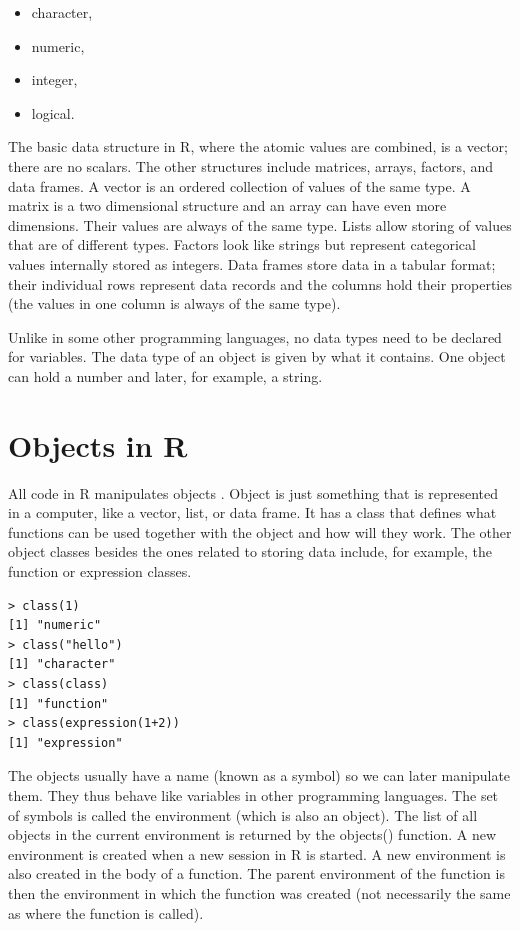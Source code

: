 \documentclass[11pt,openany,executivepaper]{book}
\begin{document}
\begin{itemize}
  \item character,
  \item numeric,
  \item integer,
  \item logical.
\end{itemize}

The basic data structure in R, where the atomic values are combined, is a vector; there are no scalars. The other structures include matrices, arrays, factors, and data frames. A vector is an ordered collection of values of the same type. A matrix is a two dimensional structure and an array can have even more dimensions. Their values are always of the same type. Lists allow storing of values that are of different types. Factors look like strings but represent categorical values internally stored as integers. Data frames store data in a tabular format; their individual rows represent data records and the columns hold their properties (the values in one column is always of the same type).

Unlike in some other programming languages, no data types need to be declared for variables. The data type of an object is given by what it contains. One object can hold a number and later, for example, a string.

\section{Objects in R}
All code in R manipulates objects \cite{4}. Object is just something that is represented in a computer, like a vector, list, or data frame. It has a class that defines what functions can be used together with the object and how will they work. The other object classes besides the ones related to storing data include, for example, the function or expression classes.

\begin{verbatim}
> class(1)
[1] "numeric"
> class("hello")
[1] "character"
> class(class)
[1] "function"
> class(expression(1+2))
[1] "expression"
\end{verbatim}

The objects usually have a name (known as a symbol) so we can later manipulate them. They thus behave like variables in other programming languages. The set of symbols is called the environment (which is also an object). The list of all objects in the current environment is returned by the objects() function. A new environment is created when a new session in R is started. A new environment is also created in the body of a function. The parent environment of the function is then the environment in which the function was created (not necessarily the same as where the function is called).
\end{document}
